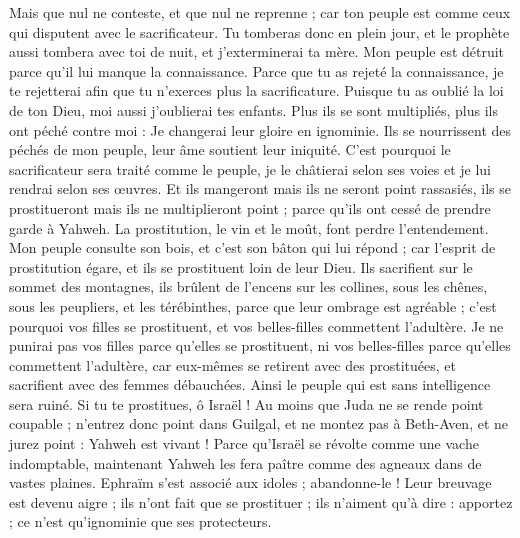 \begin{multicols}{2}
Mais que nul ne conteste, et que nul ne reprenne ; car ton peuple est comme ceux qui disputent avec le sacrificateur.
Tu tomberas donc en plein jour, et le prophète aussi tombera avec toi de nuit, et j'exterminerai ta mère.
Mon peuple est détruit parce qu’il lui manque la connaissance. Parce que tu as rejeté la connaissance, je te rejetterai afin que tu n'exerces plus la sacrificature. Puisque tu as oublié la loi de ton Dieu, moi aussi j'oublierai tes enfants.
Plus ils se sont multipliés, plus ils ont péché contre moi : Je changerai leur gloire en ignominie.
Ils se nourrissent des péchés de mon peuple, leur âme soutient leur iniquité.
C'est pourquoi le sacrificateur sera traité comme le peuple, je le châtierai selon ses voies et je lui rendrai selon ses œuvres.
Et ils mangeront mais ils ne seront point rassasiés, ils se prostitueront mais ils ne multiplieront point ; parce qu'ils ont cessé de prendre garde à Yahweh.
La prostitution, le vin et le moût, font perdre l'entendement.
Mon peuple consulte son bois, et c’est son bâton qui lui répond ; car l'esprit de prostitution égare, et ils se prostituent loin de leur Dieu.
Ils sacrifient sur le sommet des montagnes, ils brûlent de l’encens sur les collines, sous les chênes, sous les peupliers, et les térébinthes, parce que leur ombrage est agréable ; c'est pourquoi vos filles se prostituent, et vos belles-filles commettent l'adultère.
Je ne punirai pas vos filles parce qu’elles se prostituent, ni vos belles-filles parce qu’elles commettent l’adultère, car eux-mêmes se retirent avec des prostituées, et sacrifient avec des femmes débauchées. Ainsi le peuple qui est sans intelligence sera ruiné.
Si tu te prostitues, ô Israël ! Au moins que Juda ne se rende point coupable ; n'entrez donc point dans Guilgal, et ne montez pas à Beth-Aven, et ne jurez point : Yahweh est vivant !
Parce qu'Israël se révolte comme une vache indomptable, maintenant Yahweh les fera paître comme des agneaux dans de vastes plaines.
Ephraïm s'est associé aux idoles ; abandonne-le !
Leur breuvage est devenu aigre ; ils n'ont fait que se prostituer ; ils n'aiment qu'à dire : apportez ; ce n'est qu'ignominie que ses protecteurs.

\end{multicols}
